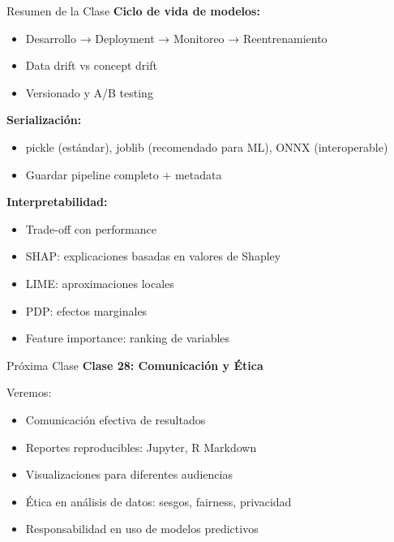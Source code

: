 \documentclass[aspectratio=169]{beamer}
\begin{document}
\begin{frame}{Resumen de la Clase}
\textbf{Ciclo de vida de modelos:}
\begin{itemize}
\item Desarrollo → Deployment → Monitoreo → Reentrenamiento
\item Data drift vs concept drift
\item Versionado y A/B testing
\end{itemize}

\vspace{0.3cm}

\textbf{Serialización:}
\begin{itemize}
\item pickle (estándar), joblib (recomendado para ML), ONNX (interoperable)
\item Guardar pipeline completo + metadata
\end{itemize}

\vspace{0.3cm}

\textbf{Interpretabilidad:}
\begin{itemize}
\item Trade-off con performance
\item SHAP: explicaciones basadas en valores de Shapley
\item LIME: aproximaciones locales
\item PDP: efectos marginales
\item Feature importance: ranking de variables
\end{itemize}
\end{frame}

\begin{frame}{Próxima Clase}
\textbf{Clase 28: Comunicación y Ética}

\vspace{0.3cm}

Veremos:
\begin{itemize}
\item Comunicación efectiva de resultados
\item Reportes reproducibles: Jupyter, R Markdown
\item Visualizaciones para diferentes audiencias
\item Ética en análisis de datos: sesgos, fairness, privacidad
\item Responsabilidad en uso de modelos predictivos
\end{itemize}
\end{frame}
\end{document}
